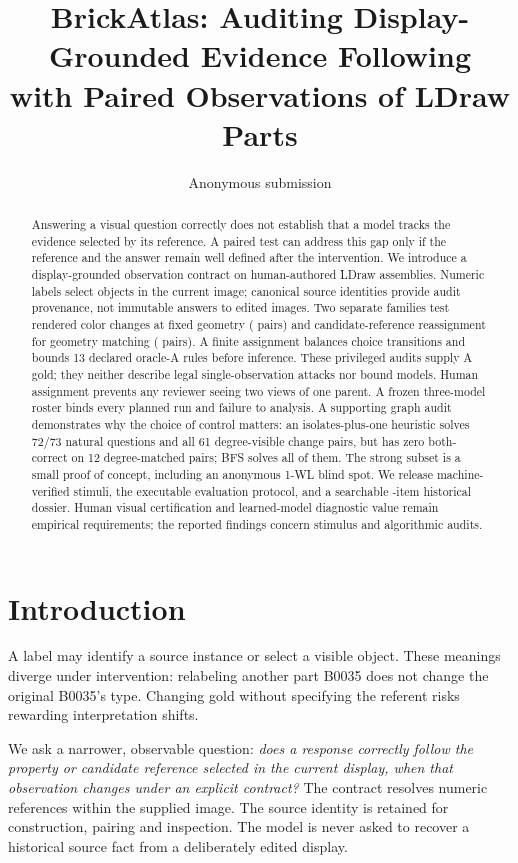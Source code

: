 \documentclass[10pt,twocolumn,letterpaper]{article}
\title{BrickAtlas: Auditing Display-Grounded Evidence Following\\
with Paired Observations of LDraw Parts}
\author{Anonymous submission}
\begin{document}
\maketitle

\begin{abstract}
Answering a visual question correctly does not establish that a model
tracks the evidence selected by its reference. A paired test can address
this gap only if the reference and the answer remain well defined after
the intervention. We introduce a display-grounded observation contract
on \EvSources{} human-authored LDraw assemblies. Numeric labels select
objects in the current image; canonical source identities provide audit
provenance, not immutable answers to edited images. Two separate families
test rendered color changes at fixed geometry (\EvColor{} pairs) and
candidate-reference reassignment for geometry matching (\EvType{} pairs).
A finite assignment balances choice transitions and bounds 13 declared
oracle-A rules before inference. These privileged audits supply A gold;
they neither describe legal single-observation attacks nor bound models.
Human assignment prevents any reviewer seeing two views of one parent.
A frozen three-model roster binds every planned run and failure to analysis.
A supporting graph audit demonstrates why the choice of control matters:
an isolates-plus-one heuristic solves 72/73 natural questions and all
61 degree-visible change pairs, but has zero both-correct on 12
degree-matched pairs; BFS solves all of them. The strong subset is a
small proof of concept, including an anonymous 1-WL blind spot.
We release machine-verified stimuli, the executable evaluation protocol,
and a searchable \EvTasks{}-item historical dossier. Human visual
certification and learned-model diagnostic value remain empirical
requirements; the reported findings concern stimulus and algorithmic
audits.
\end{abstract}

\section{Introduction}
A label may identify a source instance or select a visible object.
These meanings diverge under intervention: relabeling another part
B0035 does not change the original B0035's type. Changing gold without
specifying the referent risks rewarding interpretation shifts.

We ask a narrower, observable question: \emph{does a response correctly
follow the property or candidate reference selected in the current
display, when that observation changes under an explicit contract?}
The contract resolves numeric references within the supplied image.
The source identity is retained for construction, pairing and inspection.
The model is never asked to recover a historical source fact from a
deliberately edited display.
\end{document}

